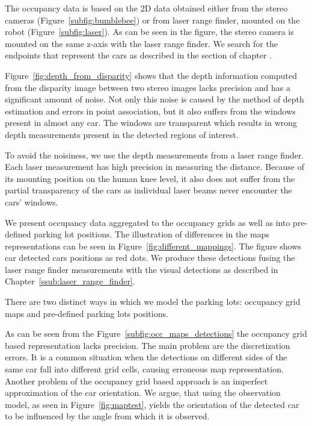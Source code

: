 The occupancy data is based on the 2D data obtained either from the stereo
cameras (Figure~\ref{subfig:bumblebee}) or from laser range finder, mounted on
the robot (Figure~\ref{subfig:laser}). As can be seen in the figure, the
stereo camera is mounted on the same z-axis with the laser range finder. We
search for the endpoints that represent the cars as described in the section
 of chapter .

Figure~\ref{fig:depth_from_disparity} shows that the depth information
computed from the disparity image between two stereo images lacks precision
and has a significant amount of noise. Not only this noise is caused by the
method of depth estimation and errors in point association, but it also
suffers from the windows present in almost any car. The windows are
transparent which results in wrong depth measurements present in the detected
regions of interest.

To avoid the noisiness, we use the depth measurements from a laser range
finder. Each laser measurement has high precision in measuring the distance.
Because of its mounting position on the human knee level, it also does not
suffer from the partial transparency of the cars as individual laser beams
never encounter the cars' windows.

We present occupancy data aggregated to the occupancy grids as well as into
pre-defined parking lot positions. The illustration of differences in the maps
representations can be seen in Figure~\ref{fig:different_mappings}. The figure
shows car detected  cars positions as red dots. We produce these detections
fusing the laser range finder measurements with the visual detections as
described in Chapter~\ref{ssub:laser_range_finder}.

There are two distinct ways in which we model the parking lots: occupancy grid
maps and pre-defined parking lots positions.

As can be seen from the Figure~\ref{subfig:occ_maps_detections} the occupancy
grid based representation lacks precision. The main problem are the
discretization errors. It is a common situation when the detections on
different sides of the same car fall into different grid cells, causing
erroneous map representation. Another problem of the occupancy grid based
approach is an imperfect approximation of the car orientation. We argue, that
using the observation model, as seen in Figure~\ref{fig:maptest}, yields the
orientation of the detected car to be influenced by the angle from which it is
observed.

